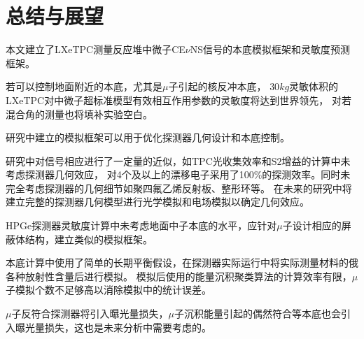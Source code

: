 
\chapter{总结与展望}

本文建立了LXeTPC测量反应堆中微子CE$\nu$NS信号的本底模拟框架和灵敏度预测框架。

若可以控制地面附近的本底，尤其是$\mu$子引起的核反冲本底，
$30\si{kg}$灵敏体积的LXeTPC对中微子超标准模型有效相互作用参数的灵敏度将达到世界领先，
对若混合角的测量也将填补实验空白。

研究中建立的模拟框架可以用于优化探测器几何设计和本底控制。

研究中对信号相应进行了一定量的近似，如TPC光收集效率和$\mathrm{S2}$增益的计算中未考虑探测器几何效应，
对4个及以上的漂移电子采用了100\%的探测效率。同时未完全考虑探测器的几何细节如聚四氟乙烯反射板、整形环等。
在未来的研究中将建立完整的探测器几何模型进行光学模拟和电场模拟以确定几何效应。

HPGe探测器灵敏度计算中未考虑地面中子本底的水平，应针对$\mu$子设计相应的屏蔽体结构，建立类似的模拟框架。

本底计算中使用了简单的长期平衡假设，在探测器实际运行中将实际测量材料的俄各种放射性含量后进行模拟。
模拟后使用的能量沉积聚类算法的计算效率有限，$\mu$子模拟个数不足够高以消除模拟中的统计误差。

$\mu$子反符合探测器将引入曝光量损失，$\mu$子沉积能量引起的偶然符合等本底也会引入曝光量损失，这也是未来分析中需要考虑的。

